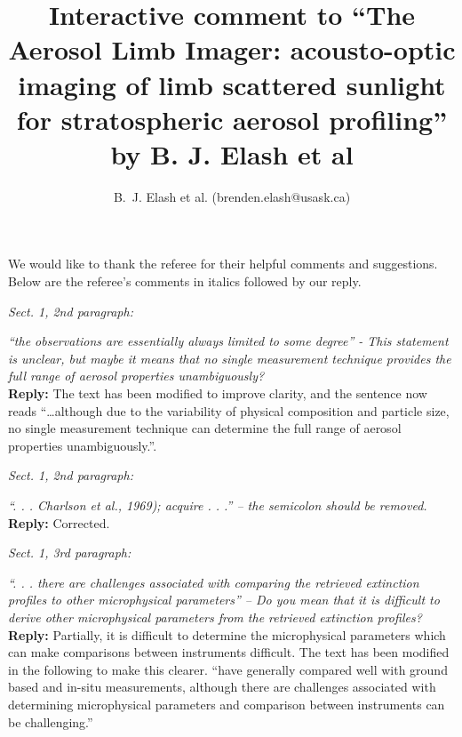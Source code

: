 \documentclass[12pt, notitlepage]{article}
\title{Interactive comment to ``The Aerosol Limb Imager: acousto-optic imaging of limb scattered
sunlight for stratospheric aerosol profiling'' by B. J. Elash et al}
\author{B.~J. Elash et al. (brenden.elash@usask.ca)}
\begin{document}
\begin{titlepage}
\maketitle
\end{titlepage}


We would like to thank the referee for their helpful comments and suggestions. Below are the referee's comments in italics followed by our reply.

\hrulefill

\textit{Sect. 1, 2nd paragraph:}

\textit{``the observations are essentially always limited to some degree'' - This statement is
unclear, but maybe it means that no single measurement technique provides the full
range of aerosol properties unambiguously?}\\

\textbf{Reply:} The text has been modified to improve clarity, and the sentence now reads ``\ldots although due to the variability of physical composition
and particle size, no single measurement technique can determine the full range of aerosol properties unambiguously.''.

\hrulefill

\textit{Sect. 1, 2nd paragraph:}

\textit{``. . . Charlson et al., 1969); acquire . . .'' – the semicolon should be removed.}\\

\textbf{Reply:} Corrected.

\hrulefill

\textit{Sect. 1, 3rd paragraph:}

\textit{``. . . there are challenges associated with comparing the retrieved extinction profiles
to other microphysical parameters'' – Do you mean that it is difficult to derive other
microphysical parameters from the retrieved extinction profiles?}\\

\textbf{Reply:} Partially, it is difficult to determine the microphysical parameters which can make comparisons between instruments  difficult. The text has been modified in the following to make this clearer. ``have generally compared well with ground based and
in-situ measurements, although there are challenges associated with
determining microphysical
parameters and comparison between instruments can be challenging.''

\hrulefill
\end{document}
